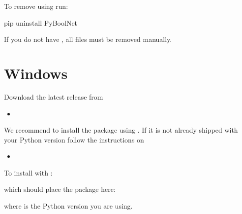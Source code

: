 \documentclass[letterpaper,10pt,english]{sphinxmanual}
\begin{document}
To remove  using  run:

\begin{sphinxVerbatim}[commandchars=\\\{\}]
\PYGZdl{} pip uninstall PyBoolNet
\end{sphinxVerbatim}

If you do not have , all files must be removed manually.


\section{Windows}
\label{\detokenize{Installation:windows}}
Download the latest release from
\begin{itemize}
\item {} 

\end{itemize}

We recommend to install the package using . If it is not already shipped with your Python version follow the instructions
on
\begin{itemize}
\item {} 

\end{itemize}

To install  with :

\begin{sphinxVerbatim}[commandchars=\\\{\}]
\PYGZbs{}   
\end{sphinxVerbatim}

which should place the package here:

\begin{sphinxVerbatim}[commandchars=\\\{\}]
\PYGZbs{}\PYGZbs{}\PYGZbs{}
\end{sphinxVerbatim}

where  is the Python version you are using.
\end{document}
